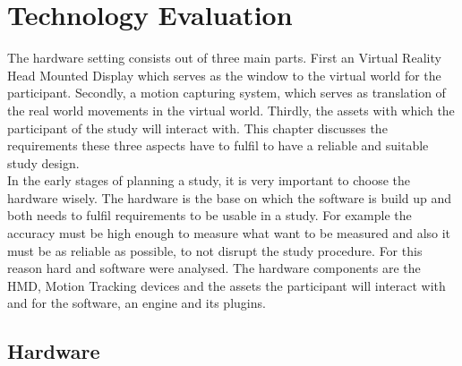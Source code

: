 \chapter{Technology Evaluation}
The hardware setting consists out of three main parts. First an Virtual Reality Head Mounted Display which serves as the window to the virtual world for the participant. Secondly, a motion capturing system, which serves as translation of the real world movements in the virtual world. Thirdly, the assets with which the participant of the study will interact with. This chapter discusses the requirements these three aspects have to fulfil to have a reliable and suitable study design.\\ 
In the early stages of planning a study, it is very important to choose the hardware wisely. The hardware is the base on which the software is build up and both needs to fulfil requirements to be usable in a study. For example the accuracy must be high enough to measure what want to be measured and also it must be as reliable as possible, to not disrupt the study procedure. For this reason hard and software were analysed. The hardware components are the HMD, Motion Tracking devices and the assets the participant will interact with and for the software, an engine and its plugins.
\section{Hardware}
